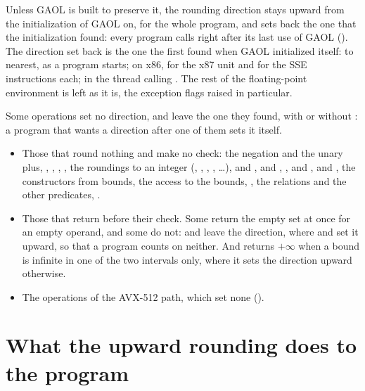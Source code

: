 \documentclass[12pt,a4paper,twoside,openright]{book}
\begin{document}
\medskip
Unless GAOL is built to preserve it, the rounding direction stays upward from
the initialization of GAOL on, for the whole program, and 
sets back the one that the initialization found: every program calls
 right after its last use of GAOL
().\newinvfive{} The direction set back is the one the first
 found when GAOL initialized itself: to nearest, as a program
starts; on x86, for the x87 unit and for the SSE instructions each; in the
thread calling . The rest of the floating-point environment is
left as it is, the exception flags raised in particular.
%

\medskip
Some operations set no direction, and leave the one they found, with or
without : a program that wants a direction
after one of them sets it itself.\newinvfive
{}%
\begin{itemize}
\item Those that round nothing and make no check: the negation and the unary
  plus, , , , , the roundings
  to an integer (, , ,
  , \ldots), \code{\&} and
  \code{|},  and , ,
   and ,  and
  , the constructors from bounds, the access to the
  bounds, , the relations and the other predicates,
  .
\item Those that return before their check. Some return the empty set at once
  for an empty operand, and some do not:  and
   leave the direction, where  and
   set it upward, so that a program counts on neither. And
   returns $+\infty$ when a bound is infinite in one of
  the two intervals only, where it sets the direction upward otherwise.
\item The operations of the AVX-512 path, which set none
  ().
\end{itemize}

\section{What the upward rounding does to the program}
\label{sec:upward-effects}
%
\end{document}
